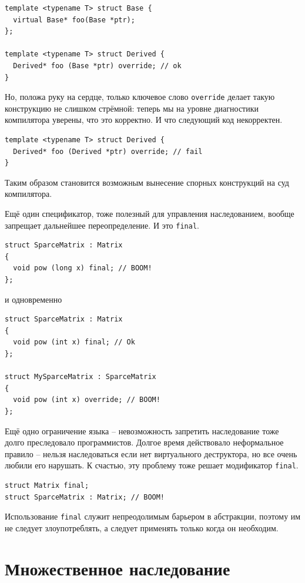 \documentclass[a4paper,12pt,oneside]{book}
\begin{document}
\begin{lstlisting}
template <typename T> struct Base {
  virtual Base* foo(Base *ptr);
};

template <typename T> struct Derived {
  Derived* foo (Base *ptr) override; // ok
}
\end{lstlisting}

Но, положа руку на сердце, только ключевое слово \lstinline!override! делает такую конструкцию не слишком стрёмной: теперь мы на уровне диагностики компилятора уверены, что это корректно. И что следующий код некорректен.

\begin{lstlisting}
template <typename T> struct Derived {
  Derived* foo (Derived *ptr) override; // fail
}
\end{lstlisting}

Таким образом становится возможным вынесение спорных конструкций на суд компилятора.

Ещё один спецификатор, тоже полезный для управления наследованием, вообще запрещает дальнейшее переопределение. И это \lstinline!final!.

\begin{lstlisting}
struct SparceMatrix : Matrix
{
  void pow (long x) final; // BOOM!
};
\end{lstlisting}

и одновременно

\begin{lstlisting}
struct SparceMatrix : Matrix
{
  void pow (int x) final; // Ok
};

struct MySparceMatrix : SparceMatrix
{
  void pow (int x) override; // BOOM!
};
\end{lstlisting}

Ещё одно ограничение языка -- невозможность запретить наследование тоже долго преследовало программистов. Долгое время действовало неформальное правило -- нельзя наследоваться если нет виртуального деструктора, но все очень любили его нарушать. К счастью, эту проблему тоже решает модификатор \lstinline!final!.

\begin{lstlisting}
struct Matrix final;
struct SparceMatrix : Matrix; // BOOM!
\end{lstlisting}

Использование \lstinline!final! служит непреодолимым барьером в абстракции, поэтому им не следует злоупотреблять, а следует применять только когда он необходим.

\pagebreak
\section{Множественное наследование}\label{MultipleInheritance}
\end{document}
